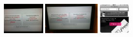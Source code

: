 \documentclass{acm_proc_article-sp}
\newcommand{\thumbheight}{16mm}
\newenvironment{thumbsequence}{}{\makebox[4mm]{}}
\begin{document}
\begin{figure}
\begin{centering}
\begin{thumbsequence}
		\includegraphics[height=\thumbheight]{resources/free/looseduplicate13.jpg}
		\includegraphics[height=\thumbheight]{resources/free/looseduplicate14.jpg}
	\end{thumbsequence}
	\begin{thumbsequence}
		\includegraphics[height=\thumbheight]{resources/free/looseduplicate15.jpg}

\end{thumbsequence}
\end{centering}
\end{figure}
\end{document}
